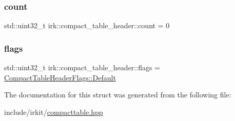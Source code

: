 \subsubsection{\texorpdfstring{count}{count}}
{\footnotesize\ttfamily std\+::uint32\+\_\+t irk\+::compact\+\_\+table\+\_\+header\+::count = 0}

\mbox{\label{structirk_1_1compact__table__header_ae76b0ba32ba8873575f480e3148f1738}} 
\subsubsection{\texorpdfstring{flags}{flags}}
{\footnotesize\ttfamily std\+::uint32\+\_\+t irk\+::compact\+\_\+table\+\_\+header\+::flags = \mbox{\hyperlink{structirk_1_1CompactTableHeaderFlags_a18debbc227dbcb7726817a08b541e5e0}{Compact\+Table\+Header\+Flags\+::\+Default}}}



The documentation for this struct was generated from the following file\+:\begin{DoxyCompactItemize}
\item 
include/irkit/\mbox{\hyperlink{compacttable_8hpp}{compacttable.\+hpp}}\end{DoxyCompactItemize}
